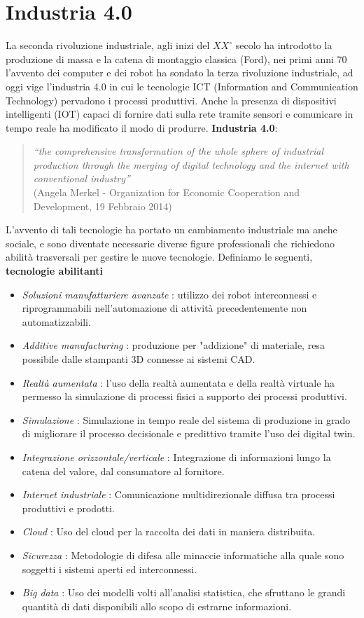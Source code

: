 \documentclass[10pt, letterpaper]{report}
\begin{document}
\section{Industria 4.0}
La seconda rivoluzione industriale, agli inizi del $XX^\circ$ secolo ha introdotto la produzione di massa e la catena 
di montaggio classica (Ford), nei primi anni 70 l'avvento dei computer e dei robot ha sondato la 
terza rivoluzione industriale, ad oggi vige l'industria 4.0 in cui le tecnologie ICT (Information and Communication Technology)
pervadono i processi produttivi. Anche la presenza di dispositivi intelligenti (IOT) capaci di fornire dati 
sulla rete tramite sensori e comunicare in tempo reale ha modificato il modo di produrre.\acc 
\textbf{Industria 4.0}:\begin{quote}
    \textit{“the comprehensive transformation of the whole sphere of
industrial production through the merging of digital technology and
the internet with conventional industry”} \\(Angela Merkel - Organization for
Economic Cooperation and Development, 19 Febbraio 2014)
\end{quote}
L'avvento di tali tecnologie ha portato un cambiamento industriale ma  anche sociale, e sono diventate necessarie 
diverse figure professionali che richiedono abilità trasversali per gestire le nuove tecnologie. Definiamo le seguenti, 
\textbf{tecnologie abilitanti}\begin{itemize}
    \item \textit{Soluzioni manufatturiere avanzate} : utilizzo dei robot interconnessi e riprogrammabili 
    nell'automazione di attività precedentemente non automatizzabili.
    \item \textit{Additive manufacturing} : produzione per "addizione" di materiale, resa possibile dalle stampanti 
    3D connesse ai sistemi CAD. 
    \item \textit{Realtà aumentata} : l'uso della realtà aumentata e della realtà virtuale ha permesso la 
     simulazione di processi fisici a supporto dei processi produttivi. 
     \item \textit{Simulazione} : Simulazione in tempo reale del sistema di produzione in grado di 
        migliorare il processo decisionale e predittivo tramite l'uso dei digital twin.
    \item \textit{Integrazione orizzontale/verticale} : Integrazione di informazioni lungo la catena del valore, dal consumatore 
    al fornitore. 
    \item \textit{Internet industriale} : Comunicazione multidirezionale diffusa tra processi produttivi e prodotti. 
    \item \textit{Cloud} : Uso del cloud per la raccolta dei dati in maniera distribuita.  
    \item \textit{Sicurezza} : Metodologie di difesa alle minaccie informatiche alla quale sono soggetti i 
    sistemi aperti ed interconnessi.  
    \item \textit{Big data} : Uso dei modelli volti all'analisi statistica, che sfruttano le grandi quantità di dati 
    disponibili allo scopo di estrarne informazioni. 
\end{itemize}
\end{document}

